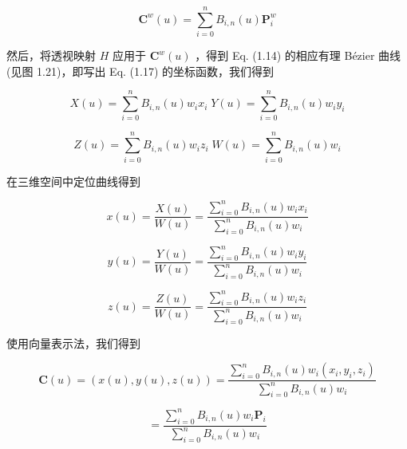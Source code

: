 \documentclass[../main.tex]{subfiles}
\begin{document}
\[
{\mathbf{C}}^{w}\left( u\right)  = \mathop{\sum }\limits_{{i = 0}}^{n}{B}_{i,n}\left( u\right) {\mathbf{P}}_{i}^{w} \tag{1.17}
\]


然后，将透视映射 \(H\) 应用于 \({\mathbf{C}}^{w}\left( u\right)\) ，得到 Eq. (1.14) 的相应有理 Bézier 曲线(见图 1.21)，即写出 Eq. (1.17) 的坐标函数，我们得到

\[
X\left( u\right)  = \mathop{\sum }\limits_{{i = 0}}^{n}{B}_{i,n}\left( u\right) {w}_{i}{x}_{i}\;Y\left( u\right)  = \mathop{\sum }\limits_{{i = 0}}^{n}{B}_{i,n}\left( u\right) {w}_{i}{y}_{i}
\]

\[
Z\left( u\right)  = \mathop{\sum }\limits_{{i = 0}}^{n}{B}_{i,n}\left( u\right) {w}_{i}{z}_{i}\;W\left( u\right)  = \mathop{\sum }\limits_{{i = 0}}^{n}{B}_{i,n}\left( u\right) {w}_{i}
\]

在三维空间中定位曲线得到

\[
x\left( u\right)  = \frac{X\left( u\right) }{W\left( u\right) } = \frac{\mathop{\sum }\limits_{{i = 0}}^{n}{B}_{i,n}\left( u\right) {w}_{i}{x}_{i}}{\mathop{\sum }\limits_{{i = 0}}^{n}{B}_{i,n}\left( u\right) {w}_{i}}
\]

\[
y\left( u\right)  = \frac{Y\left( u\right) }{W\left( u\right) } = \frac{\mathop{\sum }\limits_{{i = 0}}^{n}{B}_{i,n}\left( u\right) {w}_{i}{y}_{i}}{\mathop{\sum }\limits_{{i = 0}}^{n}{B}_{i,n}\left( u\right) {w}_{i}}
\]

\[
z\left( u\right)  = \frac{Z\left( u\right) }{W\left( u\right) } = \frac{\mathop{\sum }\limits_{{i = 0}}^{n}{B}_{i,n}\left( u\right) {w}_{i}{z}_{i}}{\mathop{\sum }\limits_{{i = 0}}^{n}{B}_{i,n}\left( u\right) {w}_{i}}
\]

\noindent\begin{minipage}{\linewidth}
使用向量表示法，我们得到

\[
\mathbf{C}\left( u\right)  = \left( {x\left( u\right) ,y\left( u\right) ,z\left( u\right) }\right)  = \frac{\mathop{\sum }\limits_{{i = 0}}^{n}{B}_{i,n}\left( u\right) {w}_{i}\left( {{x}_{i},{y}_{i},{z}_{i}}\right) }{\mathop{\sum }\limits_{{i = 0}}^{n}{B}_{i,n}\left( u\right) {w}_{i}}
\]

\[
= \frac{\mathop{\sum }\limits_{{i = 0}}^{n}{B}_{i,n}\left( u\right) {w}_{i}{\mathbf{P}}_{i}}{\mathop{\sum }\limits_{{i = 0}}^{n}{B}_{i,n}\left( u\right) {w}_{i}} \tag{1.18}
\]

\begin{center}
\begin{minipage}{13cm}
\centering
{}
\captionsetup{font=small,skip=6pt,justification=centering}
\end{minipage}
\end{center}
\end{minipage}
\par\medskip
\end{document}
